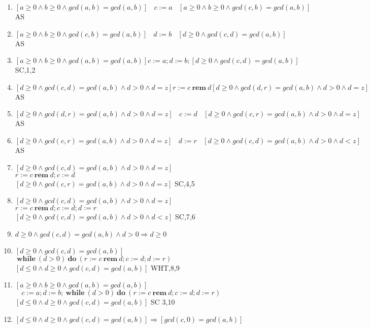 \documentclass[a4papers]{ctexart}
\newcommand{\brem}{\ \boldsymbol{rem}\ }
\newcommand{\bwhile}{\ \boldsymbol{while}\ }
\newcommand{\bdo}{\ \boldsymbol{do}\ }
\newcommand{\tab}{\ \ \ \ }
\newcommand{\w}{\wedge }
\begin{document}
\begin{enumerate}
    \item $[a\ge0 \wedge b \ge 0 \wedge gcd(a,b)=gcd(a,b) ] \tab
            c:=a\tab [a\ge0 \wedge b \ge 0 \wedge gcd(c,b)=gcd(a,b) ]$ \hfill AS
    \item $[a\ge0 \wedge b \ge 0 \wedge gcd(c,b)=gcd(a,b) ] \tab
            d:=b\tab [d \ge 0 \wedge gcd(c,d)=gcd(a,b) ]$ \hfill AS
    \item $[a\ge0 \wedge b \ge 0 \wedge gcd(a,b)=gcd(a,b) ]
            c:=a;d:=b;[d \ge 0 \wedge gcd(c,d)=gcd(a,b) ]$ \hfill SC,1,2
    \item $[d\ge 0 \w gcd(c,d)=gcd(a,b) \w d>0 \w d=z ] r:=c \brem d 
            [d\ge 0 \w gcd(d,r)=gcd(a,b) \w d>0 \w d=z ]$               \hfill AS
    \item $[d\ge 0 \w gcd(d,r)=gcd(a,b) \w d>0 \w d=z ] \tab c:=d \tab 
            [d\ge 0 \w gcd(c,r)=gcd(a,b) \w d>0 \w d=z ]$               \hfill AS
    \item $[d\ge 0 \w gcd(c,r)=gcd(a,b) \w d>0 \w d=z ] \tab d:=r \tab
            [d\ge 0 \w gcd(c,d)=gcd(a,b) \w d>0 \w d<z ]$               \hfill AS
    \item $[d\ge 0 \w gcd(c,d)=gcd(a,b) \w d>0 \w d=z ]$\\
            $ r:=c \brem d ; c:=d $\\
            $[d\ge 0 \w gcd(c,r)=gcd(a,b) \w d>0 \w d=z ]$           \hfill SC,4,5
    \item $[d\ge 0 \w gcd(c,d)=gcd(a,b) \w d>0 \w d=z ]$\\
          $ r:=c \brem d ; c:=d ; d:=r$\\
          $ [d\ge 0 \w gcd(c,d)=gcd(a,b) \w d>0 \w d<z ] $          \hfill SC,7,6
    \item  $d\ge 0 \wedge gcd(c,d)=gcd(a,b) \w d > 0 \Rightarrow d\ge 0$
    \item  $[d\ge 0 \wedge gcd(c,d)=gcd(a,b)] $\\
             $\bwhile(d>0) \bdo (r:=c \brem d;c:=d;d:=r) $\\
            $[d\le 0 \w d \ge 0 \w gcd(c,d)=gcd(a,b)]$               \hfill WHT,8,9
    \item $[a\ge0 \wedge b \ge 0 \wedge gcd(a,b)=gcd(a,b) ]$\\
            $\tab c:=a;d:=b;\bwhile(d>0) \bdo (r:=c \brem d;c:=d;d:=r)$\\  
            $[d\le 0 \w d \ge 0 \w gcd(c,d)=gcd(a,b) ]$              \hfill SC 3,10
    \item  $[d\le 0 \w d \ge 0 \w gcd(c,d)=gcd(a,b) ]\Rightarrow [gcd(c,0)=gcd(a,b)]$

\end{enumerate}
\end{document}
